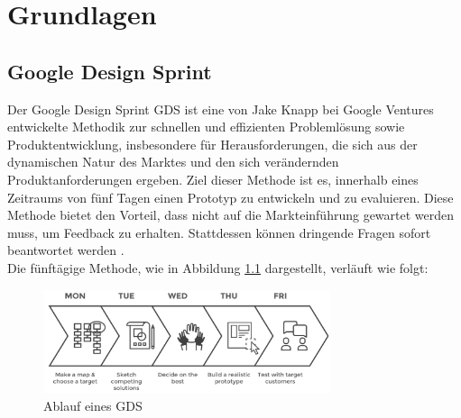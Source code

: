 \chapter{Grundlagen}

\section{Google Design Sprint}

Der Google Design Sprint \ac{GDS} ist eine von Jake Knapp bei Google Ventures entwickelte Methodik zur schnellen und effizienten Problemlösung sowie Produktentwicklung, insbesondere für Herausforderungen, die sich aus der dynamischen Natur des Marktes und den sich verändernden Produktanforderungen ergeben. 
Ziel dieser Methode ist es, innerhalb eines Zeitraums von fünf Tagen einen Prototyp zu entwickeln und zu evaluieren. 
Diese Methode bietet den Vorteil, dass nicht auf die Markteinführung gewartet werden muss, um Feedback zu erhalten. Stattdessen können dringende Fragen sofort beantwortet werden \cite[S.98 f.]{Design_Sprint}.\\
Die fünftägige Methode, wie in Abbildung \ref{fig:GDS} dargestellt, verläuft wie folgt:\\

\begin{figure}[h]
	\centering
	\includegraphics[width=0.75\textwidth]{images/GDS.png}
	\caption[Ablauf eines GDS]{Ablauf eines GDS \cite{GDS_Abbildung}}
	\label{fig:GDS}
\end{figure}

